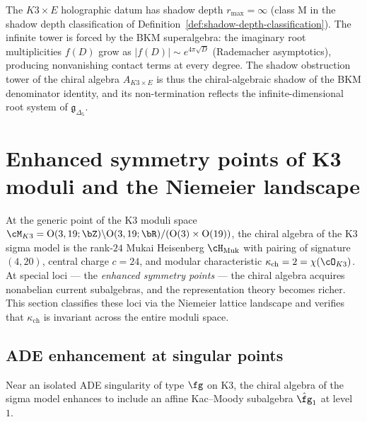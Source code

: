 \begin{remark}
\label{rem:k3e-holographic-shadow-depth}
The $K3 \times E$ holographic datum has shadow depth $r_{\max} = \infty$
(class M in the shadow depth classification of
Definition~\ref{def:shadow-depth-classification}).
The infinite tower is forced by the BKM superalgebra:
the imaginary root multiplicities $f(D)$ grow as
$|f(D)| \sim e^{4\pi\sqrt{D}}$ (Rademacher asymptotics),
producing nonvanishing contact terms at every degree.
The shadow obstruction tower of the chiral algebra $A_{K3 \times E}$
is thus the chiral-algebraic shadow of the BKM denominator identity,
and its non-termination reflects the infinite-dimensional root system
of $\mathfrak{g}_{\Delta_5}$.
\end{remark}



\section{Enhanced symmetry points of K3 moduli and the Niemeier landscape}
\label{sec:k3-moduli-niemeier-landscape}

At the generic point of the K3 moduli space
$\cM_{K3} = \mathrm{O}(3,19;\bZ) \backslash \mathrm{O}(3,19;\bR) / (\mathrm{O}(3) \times \mathrm{O}(19))$,
the chiral algebra of the K3 sigma model is the rank-$24$ Mukai
Heisenberg $\cH_{\mathrm{Muk}}$ with pairing of signature $(4,20)$,
central charge $c = 24$, and modular characteristic
$\kappa_{\mathrm{ch}} = 2 = \chi(\cO_{K3})$.
At special loci --- the \emph{enhanced symmetry points} --- the
chiral algebra acquires nonabelian current subalgebras, and the
representation theory becomes richer.  This section classifies these
loci via the Niemeier lattice landscape and verifies that
$\kappa_{\mathrm{ch}}$ is invariant across the entire moduli space.

\subsection{ADE enhancement at singular points}
\label{subsec:k3-ade-enhancement}

Near an isolated ADE singularity of type $\fg$ on K3, the chiral
algebra of the sigma model enhances to include an affine
Kac--Moody subalgebra $\hat{\fg}_1$ at level~$1$.

